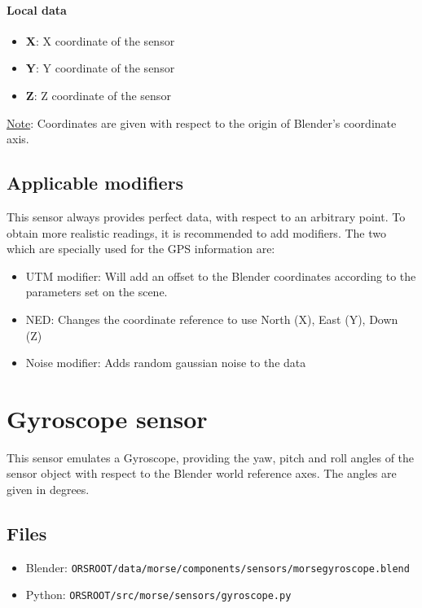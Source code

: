 \documentclass[twoside,a4paper,10pt]{report}
\newcommand{\dokutitlelevelone}[1]{\chapter{#1}}
\newcommand{\dokutitleleveltwo}[1]{\section{#1}}
\newcommand{\dokutitlelevelfour}[1]{\subsubsection{#1}}
\newcommand{\dokubold}[1]{\textbf{#1}}
\newcommand{\dokumonospace}[1]{\texttt{#1}}
\newcommand{\dokuunderline}[1]{\underline{#1}}
\newcommand{\dokuitem}{\item}
\begin{document}
\dokutitlelevelfour{Local data}

\begin{itemize}
\dokuitem  \dokubold{X}: X coordinate of the sensor
\dokuitem  \dokubold{Y}: Y coordinate of the sensor
\dokuitem  \dokubold{Z}: Z coordinate of the sensor
\end{itemize}

\dokuunderline{Note}: Coordinates are given with respect to the origin of Blender's coordinate axis.


\dokutitleleveltwo{Applicable modifiers}
\label{e70c0c8fd69fbf29dc4de09110825004}%

This sensor always provides perfect data, with respect to an arbitrary point.
To obtain more realistic readings, it is recommended to add modifiers.
The two which are specially used for the GPS information are:



\begin{itemize}
\dokuitem  UTM modifier: Will add an offset to the Blender coordinates according to the parameters set on the scene.
\end{itemize}

\begin{itemize}
\dokuitem  NED: Changes the coordinate reference to use North (X), East (Y), Down (Z)
\end{itemize}

\begin{itemize}
\dokuitem  Noise modifier: Adds random gaussian noise to the data
\end{itemize}

\dokutitlelevelone{Gyroscope sensor}
\label{85d7c1617c515754e4ff7f3604a0776f}%
\label{6b3b2d8500522343e080755f0e0aa4fe}%

This sensor emulates a Gyroscope, providing the yaw, pitch and roll angles of the sensor object with respect to the Blender world reference axes.
The angles are given in degrees.


\dokutitleleveltwo{Files}
\label{45b963397aa40d4a0063e0d85e4fe7a1}%

\begin{itemize}
\dokuitem  Blender: \dokumonospace{{\textdollar}ORS{\textunderscore}ROOT/data/morse/components/sensors/morse{\textunderscore}gyroscope.blend}
\dokuitem  Python: \dokumonospace{{\textdollar}ORS{\textunderscore}ROOT/src/morse/sensors/gyroscope.py}
\end{itemize}
\end{document}

